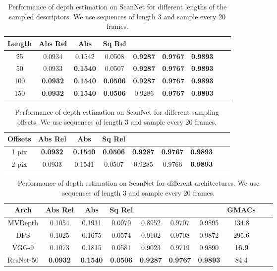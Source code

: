 \documentclass[runningheads]{llncs}
\begin{document}
\begin{table}[h]
  \caption{Performance of depth estimation on ScanNet for different lengths of the sampled descriptors. We use sequences of length 3 and sample every 20 frames. }
  \centering
\begin{tabular}{ccccccccc}
 \hline 
   Length  &Abs Rel  &Abs & Sq Rel & \textbf{}& \textbf{}& \textbf{}\\
    \hline
25 & 0.0934&	0.1542&	0.0508&	\textbf{0.9287}&	\textbf{0.9767}&	\textbf{0.9893}\\
50 & 0.0933&\textbf{0.1540}&	0.0507&	\textbf{0.9287}&	\textbf{0.9767}&	\textbf{0.9893}\\
100 & \textbf{0.0932} & \textbf{0.1540} & \textbf{0.0506} &  \textbf{0.9287} & \textbf{0.9767} & \textbf{0.9893} \\
150 &\textbf{0.0932}&	\textbf{0.1540}&	\textbf{0.0506}&	0.9286&	\textbf{0.9767}&	\textbf{0.9893}\\

\hline
  \end{tabular}
\label{tablelength}
\end{table}



\begin{table}[t]
  \caption{Performance of depth estimation on ScanNet for different sampling offsets. We use sequences of length 3 and sample every 20 frames. }
  \centering
\begin{tabular}{ccccccccc}
 \hline 
   Offsets  &Abs Rel  &Abs & Sq Rel & \textbf{}& \textbf{}& \textbf{}\\

    \hline

1 pix &	\textbf{0.0932} & \textbf{0.1540} & \textbf{0.0506} &  \textbf{0.9287} & \textbf{0.9767} & \textbf{0.9893} \\
2 pix &0.0933&	0.1541&	0.0507&	0.9285&	0.9766&	\textbf{0.9893}\\

\hline
  \end{tabular}
\label{tableoff}
\end{table}



\begin{table}[t]
  \caption{Performance of depth estimation on ScanNet for different architectures. We use sequences of length 3 and sample every 20 frames. }
  \centering
\begin{tabular}{cccccccccc}
 \hline 
   Arch  &Abs Rel  &Abs & Sq Rel & \textbf{}& \textbf{}& \textbf{} & GMACs\\
    \hline
MVDepth & 0.1054 & 0.1911 & 0.0970 & 0.8952 & 0.9707 & 0.9895 & 134.8  \\
DPS &	0.1025 & 0.1675 & 0.0574 &  0.9102 & 0.9708 & 0.9872 & 295.6	\\
VGG-9&0.1073&	0.1815&	0.0581&	0.9023&	0.9719&	0.9890 & \textbf{16.9} \\
ResNet-50 &	\textbf{0.0932} & \textbf{0.1540} & \textbf{0.0506} &  \textbf{0.9287} & \textbf{0.9767} & \textbf{0.9893} & 84.4 \\
\hline
  \end{tabular}
\label{tablearch}
\end{table}
\end{document}
